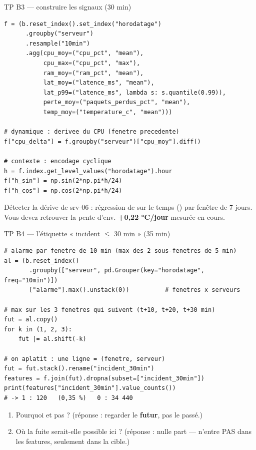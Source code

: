 \begin{frame}[fragile]{TP B3 --- construire les signaux (30 min)}
\begin{codebox}
\begin{lstlisting}
f = (b.reset_index().set_index("horodatage")
      .groupby("serveur")
      .resample("10min")
      .agg(cpu_moy=("cpu_pct", "mean"),
           cpu_max=("cpu_pct", "max"),
           ram_moy=("ram_pct", "mean"),
           lat_moy=("latence_ms", "mean"),
           lat_p99=("latence_ms", lambda s: s.quantile(0.99)),
           perte_moy=("paquets_perdus_pct", "mean"),
           temp_moy=("temperature_c", "mean")))

# dynamique : derivee du CPU (fenetre precedente)
f["cpu_delta"] = f.groupby("serveur")["cpu_moy"].diff()

# contexte : encodage cyclique
h = f.index.get_level_values("horodatage").hour
f["h_sin"] = np.sin(2*np.pi*h/24)
f["h_cos"] = np.cos(2*np.pi*h/24)
\end{lstlisting}
\end{codebox}
\begin{abox}
Détecter la dérive de srv-06 : régression de  sur le temps
() par fenêtre de 7 jours. Vous devez retrouver la pente
d'env. \textbf{+0,22 °C/jour} mesurée en cours.
\end{abox}
\end{frame}

\begin{frame}[fragile]{TP B4 --- l'étiquette « incident $\le$ 30 min » (35 min)}
\begin{codebox}
\begin{lstlisting}
# alarme par fenetre de 10 min (max des 2 sous-fenetres de 5 min)
al = (b.reset_index()
       .groupby(["serveur", pd.Grouper(key="horodatage", freq="10min")])
       ["alarme"].max().unstack(0))          # fenetres x serveurs

# max sur les 3 fenetres qui suivent (t+10, t+20, t+30 min)
fut = al.copy()
for k in (1, 2, 3):
    fut |= al.shift(-k)

# on aplatit : une ligne = (fenetre, serveur)
fut = fut.stack().rename("incident_30min")
features = f.join(fut).dropna(subset=["incident_30min"])
print(features["incident_30min"].value_counts())
# -> 1 : 120   (0,35 %)   0 : 34 440
\end{lstlisting}
\end{codebox}
\begin{wbox}
\begin{enumerate}
\item Pourquoi  et pas  ? (réponse : regarder
le \textbf{futur}, pas le passé.)
\item Où la fuite serait-elle possible ici ? (réponse : nulle part ---
 n'entre PAS dans les features, seulement dans la cible.)
\end{enumerate}
\end{wbox}
\end{frame}

